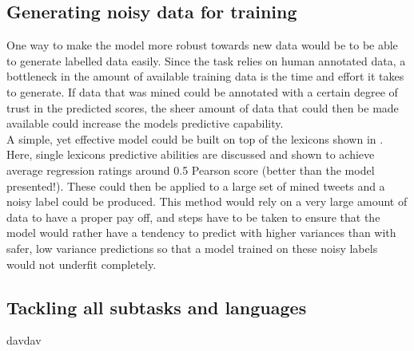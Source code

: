 \subsection{Generating noisy data for training}
One way to make the model more robust towards new data would be to be able to generate labelled data easily. Since the task relies on human annotated data, a bottleneck in the amount of available training data is the time and effort it takes to generate. If data that was mined could be annotated with a certain degree of trust in the predicted scores, the sheer amount of data that could then be made available could increase the models predictive capability.\\
A simple, yet effective model could be built on top of the lexicons shown in \cite{wassa2017}. Here, single lexicons predictive abilities are discussed and shown to achieve average regression ratings around 0.5 Pearson score (better than the model presented!). These could then be applied to a large set of mined tweets and a noisy label could be produced. This method would rely on a very large amount of data to have a proper pay off, and steps have to be taken to ensure that the model would rather have a tendency to predict with higher variances than with safer, low variance predictions so that a model trained on these noisy labels would not underfit completely.

\subsection{Tackling all subtasks and languages}
davdav
